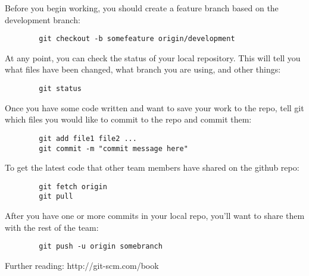 \documentclass{article}
\begin{document}
	Before you begin working, you should create a feature branch based on the development branch:

	\begin{minipage}{0.95\textwidth}\begin{lstlisting}
	    git checkout -b somefeature origin/development
	\end{lstlisting}\end{minipage}

	At any point, you can check the status of your local repository. This will tell you what files have been changed, what branch you are using, and other things:

	\begin{minipage}{0.95\textwidth}\begin{lstlisting}
	    git status
	\end{lstlisting}\end{minipage}

	Once you have some code written and want to save your work to the repo, tell git which files you would like to commit to the repo and commit them:
	
	\begin{minipage}{0.95\textwidth}\begin{lstlisting}
	    git add file1 file2 ...
	    git commit -m "commit message here"
	\end{lstlisting}\end{minipage}

	To get the latest code that other team members have shared on the github repo:

	\begin{minipage}{0.95\textwidth}\begin{lstlisting}
	    git fetch origin
	    git pull
	\end{lstlisting}\end{minipage}

	After you have one or more commits in your local repo, you'll want to share them with the rest of the team:

	\begin{minipage}{0.95\textwidth}\begin{lstlisting}
	    git push -u origin somebranch
	\end{lstlisting}\end{minipage}

	Further reading: http://git-scm.com/book
\end{document}
